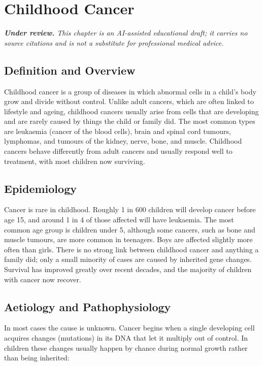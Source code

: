 \chapter{Childhood Cancer}

\medskip
\noindent\textit{\textbf{Under review.} This chapter is an AI-assisted educational draft; it carries no source citations and is not a substitute for professional medical advice.}

\section*{Definition and Overview}
Childhood cancer is a group of diseases in which abnormal cells in a child's body grow and divide without control. Unlike adult cancers, which are often linked to lifestyle and ageing, childhood cancers usually arise from cells that are developing and are rarely caused by things the child or family did. The most common types are leukaemia (cancer of the blood cells), brain and spinal cord tumours, lymphomas, and tumours of the kidney, nerve, bone, and muscle. Childhood cancers behave differently from adult cancers and usually respond well to treatment, with most children now surviving.

\section*{Epidemiology}
Cancer is rare in childhood. Roughly 1 in 600 children will develop cancer before age 15, and around 1 in 4 of those affected will have leukaemia. The most common age group is children under 5, although some cancers, such as bone and muscle tumours, are more common in teenagers. Boys are affected slightly more often than girls. There is no strong link between childhood cancer and anything a family did; only a small minority of cases are caused by inherited gene changes. Survival has improved greatly over recent decades, and the majority of children with cancer now recover.

\section*{Aetiology and Pathophysiology}
In most cases the cause is unknown. Cancer begins when a single developing cell acquires changes (mutations) in its DNA that let it multiply out of control. In children these changes usually happen by chance during normal growth rather than being inherited:

